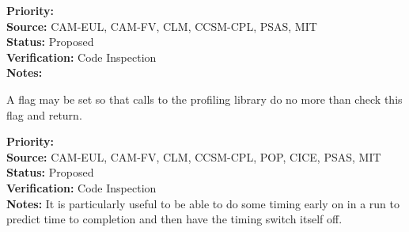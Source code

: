 \begin{reqlist}
{\bf Priority:}  \\
{\bf Source:} CAM-EUL, CAM-FV, CLM, CCSM-CPL, PSAS, MIT \\
{\bf Status:} Proposed \\
{\bf Verification:} Code Inspection \\
{\bf Notes:} 
\end{reqlist}


A flag may be set so that calls to the profiling library do no more than check
this flag and return.

\begin{reqlist}
{\bf Priority:}  \\
{\bf Source:} CAM-EUL, CAM-FV, CLM, CCSM-CPL, POP, CICE, PSAS, MIT \\
{\bf Status:} Proposed \\
{\bf Verification:} Code Inspection \\
{\bf Notes:} It is particularly useful to be able to do some timing
early on in a run to predict time to completion and then have
the timing switch itself off.
\end{reqlist}

